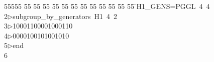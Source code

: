 %
%
\begin{tabbing}
55555 \= 55 \= 55 \= 55 \= 55 \= 55 \= 55 \= 55 \= 55 \= 55 \= 55 \= 55 \= 55 \= \>H1\_GENS=PGGL\ 4\ 4\ \\[0pt]
2\>$\triangleright$\>subgroup\_by\_generators\ H1\ 4\ 2\ \\[0pt]
3\>$\triangleright$\>10001100001000110\ \\[0pt]
4\>$\triangleright$0000100101001010\ \\[0pt]
5\>$\triangleright$\>end\\[0pt]
6\>\end{tabbing}
